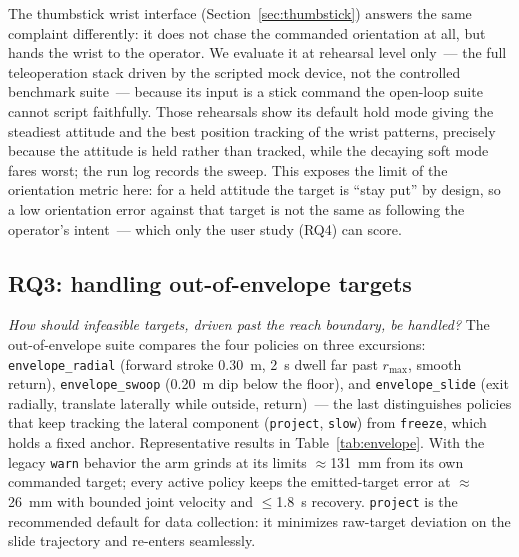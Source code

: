 The thumbstick wrist interface (Section~\ref{sec:thumbstick}) answers the
same complaint differently: it does not chase the commanded orientation at
all, but hands the wrist to the operator. We evaluate it at rehearsal level
only~--- the full teleoperation stack driven by the scripted mock device,
not the controlled benchmark suite~--- because its input is a stick command
the open-loop suite cannot script faithfully. Those rehearsals show its
default hold mode giving the steadiest attitude and the best position
tracking of the wrist patterns, precisely because the attitude is held
rather than tracked, while the decaying soft mode fares worst; the run log
records the sweep. This exposes the limit of the orientation metric here:
for a held attitude the target is ``stay put'' by design, so a low
orientation error against that target is not the same as following the
operator's intent~--- which only the user study (RQ4) can score.

\subsection{RQ3: handling out-of-envelope targets}
\label{sec:exp-envelope}

\emph{How should infeasible targets, driven past the reach boundary, be
handled?} The out-of-envelope suite compares the four policies on three
excursions: \texttt{envelope\_radial} (forward stroke \SI{0.30}{m},
\SI{2}{s} dwell far past \(r_{\max}\), smooth return),
\texttt{envelope\_swoop} (\SI{0.20}{m} dip below the floor), and
\texttt{envelope\_slide} (exit radially, translate laterally while outside,
return)~--- the last distinguishes policies that keep tracking the lateral
component (\texttt{project}, \texttt{slow}) from \texttt{freeze}, which
holds a fixed anchor. Representative results in
Table~\ref{tab:envelope}. With the legacy \texttt{warn} behavior the arm
grinds at its limits \(\approx\)\SI{131}{mm} from its own commanded target;
every active policy keeps the emitted-target error at
\(\approx\)\SI{26}{mm} with bounded joint velocity and \(\le\)\SI{1.8}{s}
recovery. \texttt{project} is the recommended default for data collection:
it minimizes raw-target deviation on the slide trajectory and re-enters
seamlessly.

\begin{table}[h]
  \centering
  \caption{Out-of-envelope suite, \texttt{envelope\_slide} with
  \texttt{pink\_relaxed} (policy comparison; full sweep in the
  supplementary table set).}
  \label{tab:envelope}
  \small
  
\end{table}

